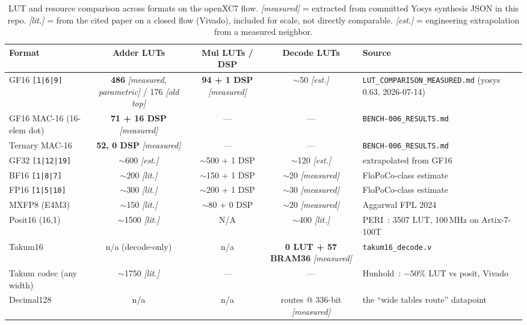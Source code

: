 \documentclass[11pt]{article}
\begin{document}
\begin{table}[h]
\centering
\small
\caption{LUT and resource comparison across formats on the openXC7 flow.
\textit{[measured]} = extracted from committed Yosys synthesis JSON in this
repo. \textit{[lit.]} = from the cited paper on a closed flow (Vivado),
included for scale, not directly comparable. \textit{[est.]} = engineering
extrapolation from a measured neighbor.}
\label{tab:lut}
\begin{tabular}{lcccp{3.4cm}}
\toprule
Format & Adder LUTs & Mul LUTs / DSP & Decode LUTs & Source \\
\midrule
GF16 \texttt{[1|6|9]}
  & \textbf{486} \textit{[measured, parametric]} / 176 \textit{[old top]}
  & \textbf{94 + 1 DSP} \textit{[measured]}
  & ${\sim}$50 \textit{[est.]}
  & \texttt{LUT\_COMPARISON\_MEASURED.md} (yosys 0.63, 2026-07-14) \\
GF16 MAC-16 (16-elem dot)
  & \textbf{71 + 16 DSP} \textit{[measured]}
  & --- & --- & \texttt{BENCH-006\_RESULTS.md} \\
Ternary MAC-16
  & \textbf{52, 0 DSP} \textit{[measured]}
  & --- & --- & \texttt{BENCH-006\_RESULTS.md} \\
GF32 \texttt{[1|12|19]}
  & ${\sim}$600 \textit{[est.]}
  & ${\sim}$500 + 1 DSP
  & ${\sim}$120 \textit{[est.]}
  & extrapolated from GF16 \\
BF16 \texttt{[1|8|7]}
  & ${\sim}$200 \textit{[lit.]}
  & ${\sim}$150 + 1 DSP
  & ${\sim}$20 \textit{[measured]}
  & FloPoCo-class estimate \\
FP16 \texttt{[1|5|10]}
  & ${\sim}$300 \textit{[lit.]}
  & ${\sim}$200 + 1 DSP
  & ${\sim}$30 \textit{[measured]}
  & FloPoCo-class estimate \\
MXFP8 (E4M3)
  & ${\sim}$150 \textit{[lit.]}
  & ${\sim}$80 + 0 DSP
  & ${\sim}$20 \textit{[measured]}
  & Aggarwal FPL 2024~\cite{aggarwal2024minifloat} \\
Posit16 (16,1)
  & ${\sim}$1500 \textit{[lit.]}
  & N/A
  & ${\sim}$400 \textit{[lit.]}
  & PERI~\cite{tiwari2019peri}: 3507 LUT, 100\,MHz on Artix-7-100T \\
Takum16
  & n/a (decode-only)
  & n/a
  & \textbf{0 LUT + 57 BRAM36} \textit{[measured]}
  & \texttt{takum16\_decode.v} \\
Takum codec (any width)
  & ${\sim}$1750 \textit{[lit.]}
  & --- & ---
  & Hunhold~\cite{hunhold2024takumcodec}: $-50\%$ LUT vs posit, Vivado \\
Decimal128
  & n/a & n/a
  & routes @ 336-bit \textit{[measured]}
  & the ``wide tables route'' datapoint \\
\bottomrule
\end{tabular}
\end{table}
\end{document}
